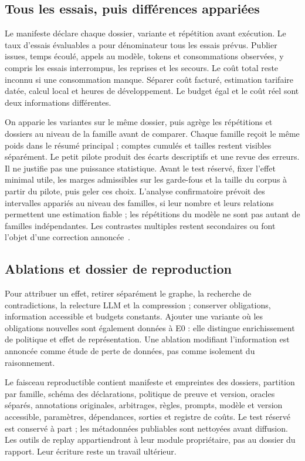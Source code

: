 \documentclass[11pt,a4paper]{article}
\begin{document}
\subsection{Tous les essais, puis différences appariées}
Le manifeste déclare chaque dossier, variante et répétition avant exécution.
Le taux d'essais évaluables a pour dénominateur tous les essais prévus.
Publier issues, temps écoulé, appels au modèle, tokens et consommations
observées, y compris les essais interrompus, les reprises et les secours.
Le coût total reste inconnu si une consommation manque. Séparer coût facturé,
estimation tarifaire datée, calcul local et heures de développement.
Le budget égal et le coût réel sont deux informations différentes.

On apparie les variantes sur le même dossier, puis agrège les répétitions et
dossiers au niveau de la famille avant de comparer. Chaque famille reçoit
le même poids dans le résumé principal ; comptes cumulés et tailles restent
visibles séparément. Le petit pilote produit des écarts descriptifs et une revue
des erreurs. Il ne justifie pas une puissance statistique. Avant le test réservé,
fixer l'effet minimal utile, les marges admissibles sur les garde-fous et la taille
du corpus à partir du pilote, puis geler ces choix. L'analyse confirmatoire
prévoit des intervalles appariés au niveau des familles, si leur nombre et leurs
relations permettent une estimation fiable ; les répétitions du modèle ne sont
pas autant de familles indépendantes. Les contrastes multiples restent
secondaires ou font l'objet d'une correction annoncée~\cite{demsar}.

\subsection{Ablations et dossier de reproduction}
Pour attribuer un effet, retirer séparément le graphe, la recherche de
contradictions, la relecture LLM et la compression ; conserver obligations,
information accessible et budgets constants. Ajouter une variante où les
obligations nouvelles sont également données à E0 : elle distingue enrichissement
de politique et effet de représentation. Une ablation modifiant l'information
est annoncée comme étude de perte de données, pas comme isolement du raisonnement.

Le faisceau reproductible contient manifeste et empreintes des dossiers,
partition par famille, schéma des déclarations, politique de preuve et version,
oracles séparés, annotations originales, arbitrages, règles, prompts, modèle
et version accessible, paramètres, dépendances, sorties et registre de coûts.
Le test réservé est conservé à part ; les métadonnées publiables sont nettoyées
avant diffusion. Les outils de replay appartiendront à leur module propriétaire,
pas au dossier du rapport. Leur écriture reste un travail ultérieur.
\end{document}
